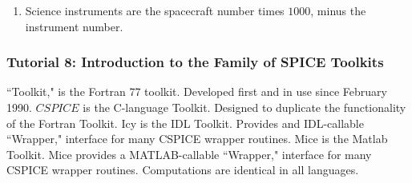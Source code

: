 \documentclass[crop=false,class=book]{standalone}
\begin{document}
\begin{enumerate}
\begin{itemize}
                \end{itemize}
                \item Science instruments are the spacecraft number times $1000$, minus the instrument number.
                \begin{itemize}
                \end{itemize}
            \end{enumerate}
            \subsubsection{Tutorial 8: Introduction to the Family of SPICE Toolkits}
            ``Toolkit," is the Fortran 77 toolkit. Developed first and in use since February 1990. $CSPICE$ is the C-language Toolkit. Designed to duplicate the functionality of the Fortran Toolkit. Icy is the IDL Toolkit. Provides and IDL-callable ``Wrapper," interface for many CSPICE wrapper routines. Mice is the Matlab Toolkit. Mice provides a MATLAB-callable ``Wrapper," interface for many CSPICE wrapper routines. Computations are identical in all languages. 
\end{document}

